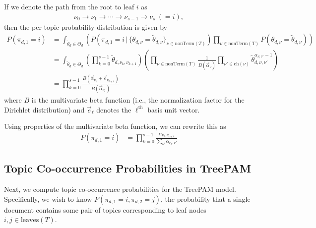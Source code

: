 \documentclass{article}
\theoremstyle{definition}
\newcommand{\nth}{^{\text{th}}}
\newcommand{\leaves}{\text{leaves}}
\newcommand{\nonTerm}{\text{nonTerm}}
\begin{document}
If we denote the path from the root to leaf $i$ as
\begin{align*}
\nu_0 \to \nu_1 \to \cdots \to \nu_{s-1} \to \nu_s \ (=i),
\end{align*}
then the per-topic probability distribution is given by
\begin{align*}
P(\pi_{d,1} = i)
&=
\int_{\tilde \theta_d \in \Theta_d}
  \left(
  P\left(\pi_{d,1}=i \,|\, \{ \theta_{d,\nu} = \tilde \theta_{d,\nu} \}_{\nu \in \nonTerm(T)}\right)
  \prod_{\nu \in \nonTerm(T)} P\left(\theta_{d,\nu} = \tilde \theta_{d,\nu}\right)
  \right)
\\
&=
\int_{\tilde \theta_d \in \Theta_d}
  \left(
  \prod_{k=0}^{s-1} \tilde \theta_{d,\nu_k,\nu_{k+1}}
  \right)
  \left(
  \prod_{\nu \in \nonTerm(T)}
  \frac{1}{B(\vec\alpha_\nu)}
  \prod_{\nu' \in \text{ch}(\nu)}
  \tilde \theta_{d,\nu,\nu'}^{\alpha_{\nu,\nu'}-1}
  \right)
\\
&=
\prod_{k=0}^{s-1}
  \frac{B(\vec\alpha_{\nu_k} + \vec e_{\nu_{k+1}})}
       {B(\vec\alpha_{\nu_k})}
\end{align*}
where $B$ is the multivariate beta function (i.e., the normalization factor for the Dirichlet distribution) and $\vec e_\ell$ denotes the $\ell\nth$ basis unit vector.

Using properties of the multivariate beta function, we can rewrite this as
\begin{align*}
P(\pi_{d,1} = i)
&=
\prod_{k=0}^{s-1}
  \frac{\alpha_{\nu_k,\nu_{k+1}}}
       {\sum_{\nu'} \alpha_{\nu_k,\nu'}}
\end{align*}

\subsection{Topic Co-occurrence Probabilities in TreePAM}

Next, we compute topic co-occurrence probabilities for the TreePAM model.
Specifically, we wish to know $P(\pi_{d,1} = i, \pi_{d,2} = j)$, the probability that a single document contains some pair of topics corresponding to leaf nodes $i, j \in \leaves(T)$.
\end{document}

